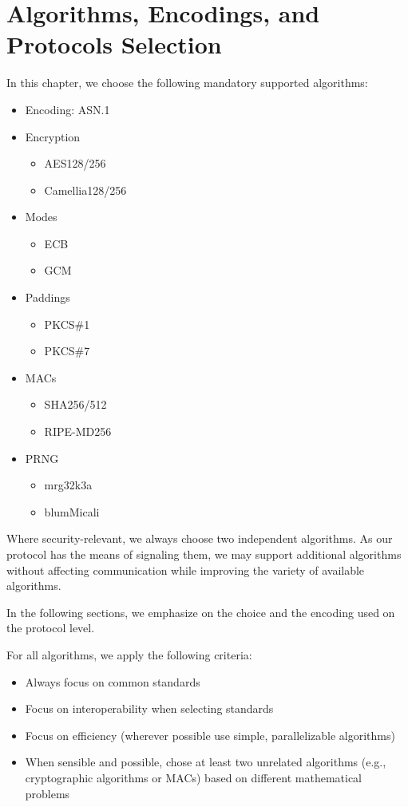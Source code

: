 \chapter{Algorithms, Encodings, and Protocols Selection}\label{sec:selection}
In this chapter, we choose the following mandatory supported algorithms:
\begin{itemize}
	\item Encoding: ASN.1
	\item Encryption
	\begin{itemize}
		\item AES128/256
		\item Camellia128/256
	\end{itemize}
	\item Modes
	\begin{itemize}
		\item ECB
		\item GCM
	\end{itemize}
	\item Paddings
	\begin{itemize}
		\item PKCS\#1
		\item PKCS\#7
	\end{itemize}
	\item MACs
	\begin{itemize}
		\item SHA256/512
		\item RIPE-MD256
	\end{itemize}
	\item PRNG
	\begin{itemize}
		\item mrg32k3a
		\item blumMicali
	\end{itemize}
\end{itemize}

Where security-relevant, we always choose two independent algorithms. As our protocol has the means of signaling them, we may support additional algorithms without affecting communication while improving the variety of available algorithms.

In the following sections, we emphasize on the choice and the encoding used on the protocol level.

For all algorithms, we apply the following criteria:
\begin{itemize}
	\item Always focus on common standards
	\item Focus on interoperability when selecting standards
	\item Focus on efficiency (wherever possible use simple, parallelizable algorithms)
	\item When sensible and possible, chose at least two unrelated algorithms (e.g., cryptographic algorithms or MACs) based on different mathematical problems
\end{itemize}

